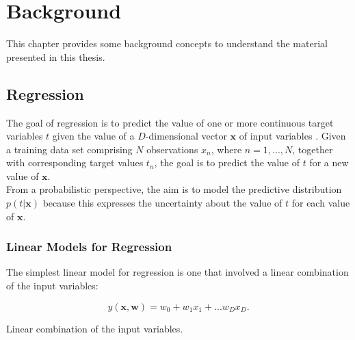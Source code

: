 \chapter{Background}
\label{chap:background}
This chapter provides some background concepts to understand the material 
presented in this thesis. 


\section{Regression}
\label{sec:regression}
The goal of regression is to predict the value of one or more continuous target variables $t$ given the value of a $D$-dimensional vector $\bm{x}$ of input variables \cite[]{bishop:2006:PRML}. Given a training data set comprising $N$ observations ${x_n}$, where $n = 1,...,N$, together with corresponding target values ${t_n}$, the goal is to predict the value of $t$ for a new value of $\bm{x}$. \\

\noindent From a probabilistic perspective, the aim is to model the predictive distribution $p(t | \bm{x})$ because this expresses the uncertainty about the value of $t$ for each value of $\bm{x}$.

\subsection{Linear Models for Regression}
\label{subsec:reglinuniv}

The simplest linear model for regression is one that involved a linear combination of the input variables:
\begin{Equation}[H]
	\centering
	\begin{equation} \label{eq:lincomb}
		y(\bm{x}, \bm{w})=w_0 + w_1x_1+...w_D x_D .
	\end{equation}
	\caption[Linear combination of the input variables.]{Linear combination of the input variables.}
\end{Equation}

